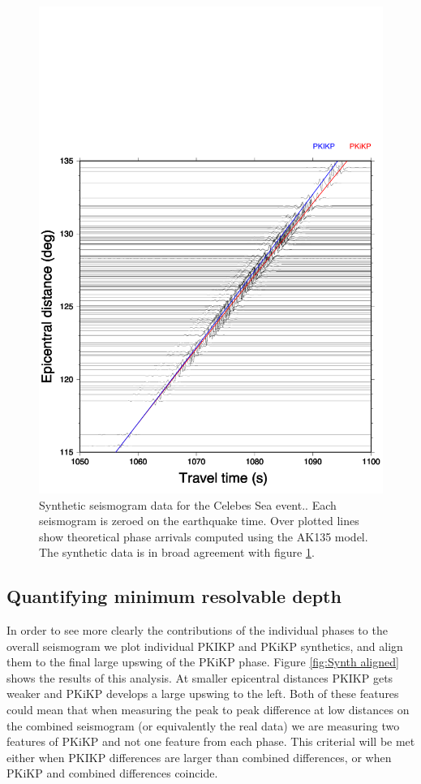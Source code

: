 \documentclass[11pt,a4paper]{article}
\begin{document}
\begin{figure}
	\includegraphics[width=\textwidth]{figures/celebessea_synthetic_both.pdf}
	\caption{Synthetic seismogram data for the Celebes Sea event.. Each seismogram is zeroed on the earthquake time. Over plotted lines show theoretical phase arrivals computed using the AK135 model. The synthetic data is in broad agreement with figure \ref{fig:Synth nonaligned}.}
	\label{fig:Synth nonaligned}
\end{figure}

\subsection{Quantifying minimum resolvable depth}
In order to see more clearly the contributions of the individual phases to the overall seismogram we plot individual PKIKP and PKiKP synthetics, and align them to the final large upswing of the PKiKP phase. Figure \ref{fig:Synth aligned} shows the results of this analysis. At smaller epicentral distances PKIKP gets weaker and PKiKP develops a large upswing to the left. Both of these features could mean that when measuring the peak to peak difference at low distances on the combined seismogram (or equivalently the real data) we are measuring two features of PKiKP and not one feature from each phase. This criterial will be met either when PKIKP differences are larger than combined differences, or when PKiKP and combined differences coincide.
\end{document}
